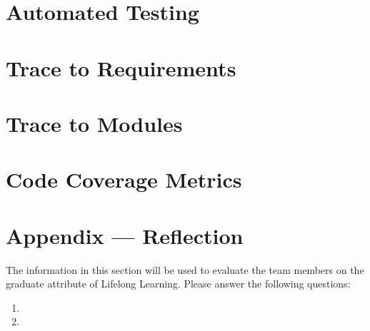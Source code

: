 \documentclass[12pt, titlepage]{article}
\begin{document}
\section{Automated Testing}
		
\section{Trace to Requirements}
		
\section{Trace to Modules}		

\section{Code Coverage Metrics}




\newpage{}
\section*{Appendix --- Reflection}

The information in this section will be used to evaluate the team members on the
graduate attribute of Lifelong Learning.  Please answer the following questions:

\begin{enumerate}
  \item 
  \item 
\end{enumerate}
\end{document}

